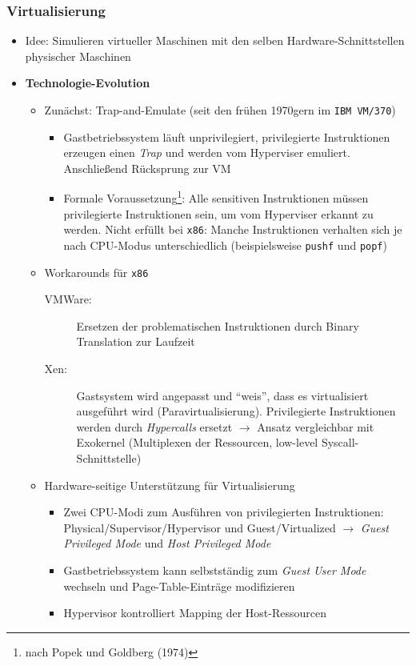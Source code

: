 \subsubsection{Virtualisierung}
\begin{itemize}
	\item Idee: Simulieren virtueller Maschinen mit den selben Hardware-Schnittstellen physischer Maschinen
	\item \textbf{Technologie-Evolution}
	\begin{itemize}
		\item Zunächst: Trap-and-Emulate (seit den frühen 1970gern im \texttt{IBM VM/370})
		\begin{itemize}
			\item Gastbetriebssystem läuft unprivilegiert, privilegierte Instruktionen erzeugen einen \textit{Trap} und werden vom Hyperviser emuliert. Anschließend Rücksprung zur VM
			\item Formale Voraussetzung\footnote{nach Popek und Goldberg (1974)}: Alle sensitiven Instruktionen müssen privilegierte Instruktionen sein, um vom Hyperviser erkannt zu werden. Nicht erfüllt bei \texttt{x86}: Manche Instruktionen verhalten sich je nach CPU-Modus unterschiedlich (beispielsweise \texttt{pushf} und \texttt{popf})
		\end{itemize}
		\item Workarounds für \texttt{x86}
		\begin{description}
			\item[VMWare:] Ersetzen der problematischen Instruktionen durch Binary Translation zur Laufzeit
			\item[Xen:] Gastsystem wird angepasst und "`weis"', dass es virtualisiert ausgeführt wird (Paravirtualisierung). Privilegierte Instruktionen werden durch \textit{Hypercalls} ersetzt \(\rightarrow\) Ansatz vergleichbar mit Exokernel (Multiplexen der Ressourcen, low-level Syscall-Schnittstelle)
		\end{description}
		\item Hardware-seitige Unterstützung für Virtualisierung
		\begin{itemize}
			\item Zwei CPU-Modi zum Ausführen von privilegierten Instruktionen: Physical/Supervisor/Hypervisor und Guest/Virtualized \(\rightarrow\) \textit{Guest Privileged Mode} und \textit{Host Privileged Mode}
			\item Gastbetriebssystem kann selbstständig zum \textit{Guest User Mode} wechseln und Page-Table-Einträge modifizieren
			\item Hypervisor kontrolliert Mapping der Host-Ressourcen
		\end{itemize}
	\end{itemize}
\end{itemize}























